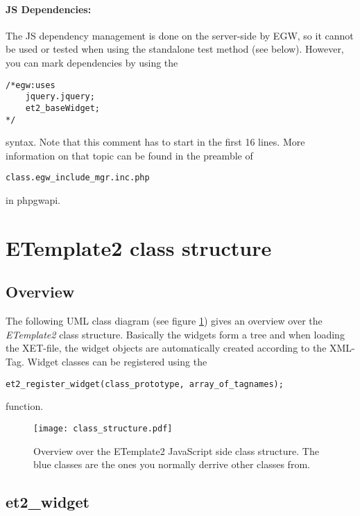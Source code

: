 \documentclass[10pt,a4paper]{report}
\begin{document}
\paragraph{JS Dependencies:}
The JS dependency management is done on the server-side by EGW, so it cannot be used or tested when using the standalone test method (see below). However, you can mark dependencies by using the
\begin{verbatim}
/*egw:uses
    jquery.jquery;
    et2_baseWidget;
*/
\end{verbatim}
syntax. Note that this comment has to start in the first 16 lines. More information on that topic can be found in the preamble of 

\begin{center}\texttt{class.egw\_include\_mgr.inc.php}\end{center}

in phpgwapi.


\section*{ETemplate2 class structure}

\subsection*{Overview}
The following UML class diagram (see figure \ref{fig:uml}) gives an overview over the \textit{ETemplate2} class structure. Basically the widgets form a tree and when loading the XET-file, the widget objects are automatically created according to the XML-Tag. Widget classes can be registered using the
\begin{verbatim}
et2_register_widget(class_prototype, array_of_tagnames);
\end{verbatim}
function.

\begin{figure}
	\begin{center}
		\texttt{[image: class\_structure.pdf]}
	\end{center}
	\caption{Overview over the ETemplate2 JavaScript side class structure. The blue classes are the ones you normally derrive other classes from.}
	\label{fig:uml}
\end{figure}

\subsection*{et2\_widget}
\end{document}
